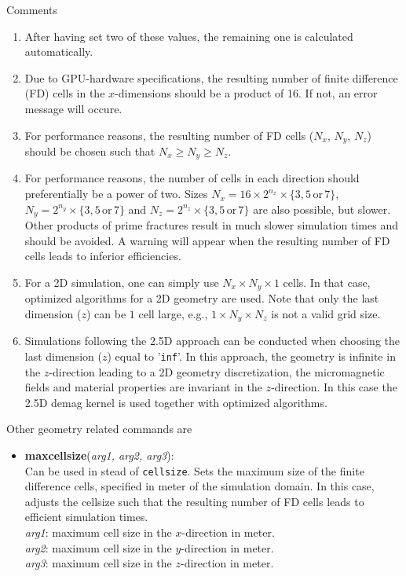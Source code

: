 Comments
\begin{enumerate}
 \item After having set two of these values, the remaining one is calculated automatically. 
 \item Due to GPU-hardware specifications, the resulting number of finite difference (FD) cells in the $x$-dimensions should be a product of 16.  If not, an error message will occure.
 \item For performance reasons, the resulting number of FD cells ($N_x$, $N_y$, $N_z$) should be chosen such that $N_x\geq N_y \geq N_z$.
 \item For performance reasons, the number of cells in each direction should preferentially be a power of two. Sizes $N_x=16\times2^{n_x}\times\{3,5 \mathrm{\,or\,} 7\}$, $N_y=2^{n_y}\times\{3,5 \mathrm{\,or\,} 7\}$ and $N_z=2^{n_z}\times\{3,5 \mathrm{\,or\,} 7\}$ are also possible, but slower. Other products of prime fractures result in much slower simulation times and should be avoided.  A warning will appear when the resulting number of FD cells leads to inferior efficiencies.
 \item For a 2D simulation, one can simply use $N_x \times N_y \times 1$ cells. In that case, optimized algorithms for a 2D geometry are used. Note that only the last dimension ($z$) can be $1$ cell large, e.g., $1 \times N_y \times N_z$ is not a valid grid size.
 \item Simulations following the 2.5D approach can be conducted when choosing the last dimension ($z$) equal to '\texttt{inf}'.  In this approach, the geometry is infinite in the $z$-direction leading to a 2D geometry discretization, the micromagnetic fields and material properties are invariant in the $z$-direction.  In this case the 2.5D demag kernel is used together with optimized algorithms.
\end{enumerate}

Other geometry related commands are

\begin{itemize}
 \item \textbf{maxcellsize}(\textit{arg1, arg2, arg3}):\\
				Can be used in stead of \texttt{cellsize}.  Sets the maximum size of the finite difference cells, specified in meter of the simulation domain.  In this case, \mumax adjusts the cellsize such that the resulting number of FD cells leads to efficient simulation times.\\
				\textit{arg1}: maximum cell size in the $x$-direction in meter.\\
				\textit{arg2}: maximum cell size in the $y$-direction in meter.\\
				\textit{arg3}: maximum cell size in the $z$-direction in meter.
\end{itemize}



